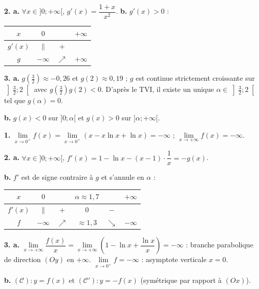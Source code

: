 \documentclass[11pt]{article}
\begin{document}
\textbf{2. a.} $\forall x \in ]0;+\infty[$, $g'(x) = \dfrac{1 + x}{x^2}$. \textbf{b.} $g'(x) > 0$ :
\begin{center}\renewcommand{\arraystretch}{1.4}
\begin{tabular}{|c|ccc|}
\hline $x$ & $0$ & & $+\infty$ \\\hline $g'(x)$ & $\|$ & $+$ & \\\hline $g$ & $-\infty$ & $\nearrow$ & $+\infty$ \\\hline
\end{tabular}
\end{center}

\textbf{3. a.} $g\left(\tfrac{3}{2}\right) \approx -0{,}26$ et $g(2) \approx 0{,}19$ ; $g$ est continue strictement croissante sur $\left]\tfrac{3}{2};2\right[$ avec $g(\tfrac{3}{2})g(2) < 0$. D'après le TVI, il existe un unique $\alpha \in \left]\tfrac{3}{2};2\right[$ tel que $g(\alpha) = 0$.

\textbf{b.} $g(x) < 0$ sur $]0;\alpha[$ et $g(x) > 0$ sur $]\alpha;+\infty[$.

\textbf{1.} $\lim\limits_{x\to 0^+} f(x) = \lim\limits_{x\to 0^+}(x - x\ln x + \ln x) = -\infty$ ; $\lim\limits_{x\to+\infty} f(x) = -\infty$.

\textbf{2. a.} $\forall x \in ]0;+\infty[$, $f'(x) = 1 - \ln x - (x-1)\cdot\dfrac{1}{x} = -g(x)$.

\textbf{b.} $f'$ est de signe contraire à $g$ et s'annule en $\alpha$ :
\begin{center}\renewcommand{\arraystretch}{1.4}
\begin{tabular}{|c|ccccc|}
\hline $x$ & $0$ & & $\alpha\approx 1{,}7$ & & $+\infty$ \\\hline $f'(x)$ & $\|$ & $+$ & $0$ & $-$ & \\\hline $f$ & $-\infty$ & $\nearrow$ & $\approx 1{,}3$ & $\searrow$ & $-\infty$ \\\hline
\end{tabular}
\end{center}

\textbf{3. a.} $\lim\limits_{x\to+\infty}\dfrac{f(x)}{x} = \lim\limits_{x\to+\infty}\left(1 - \ln x + \dfrac{\ln x}{x}\right) = -\infty$ : branche parabolique de direction $(Oy)$ en $+\infty$. $\lim\limits_{x\to 0^+} f = -\infty$ : asymptote verticale $x = 0$.

\textbf{b.} $(\mathcal{C}) : y = f(x)$ et $(\mathcal{C}') : y = -f(x)$ (symétrique par rapport à $(Ox)$).
\begin{center}
\end{center}
\end{document}
